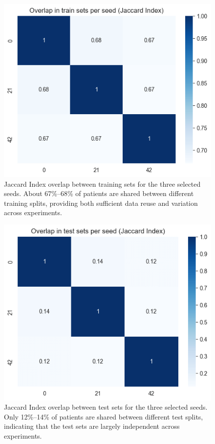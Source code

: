 \documentclass[a4paper,10pt]{book}
\begin{document}
\begin{figure}[h!]
	\centering
	\includegraphics[width=0.8\linewidth]{reports/assets/overlap_train.png}
	\caption[Overlap index (Train)]{Jaccard Index overlap between training sets for the three selected seeds. About 67\%--68\% of patients are shared between different training splits, providing both sufficient data reuse and variation across experiments.}
	\label{fig:overlap_train}
\end{figure}

\begin{figure}[h!]
	\centering
	\includegraphics[width=0.8\linewidth]{reports/assets/overlap_test.png}
	\caption[Overlap index (Test)]{Jaccard Index overlap between test sets for the three selected seeds. Only 12\%--14\% of patients are shared between different test splits, indicating that the test sets are largely independent across experiments.}
	\label{fig:overlap_test}
\end{figure}
\newpage
\end{document}
